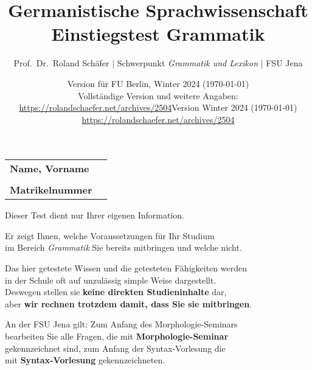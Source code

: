 \documentclass[12pt,a4paper,twoside]{article}
\author{Prof.\ Dr.\ Roland Schäfer | Schwerpunkt \textit{Grammatik und Lexikon} | FSU Jena}
\title{Germanistische Sprachwissenschaft\\Einstiegstest Grammatik}
\date{Version für FU Berlin, Winter 2024 (\today)\\[\baselineskip]
  Vollständige Version und weitere Angaben:\\[0.25\baselineskip]
    \url{https://rolandschaefer.net/archives/2504}}
\date{Version Winter 2024 (\today)\\[0.5\baselineskip]
    \url{https://rolandschaefer.net/archives/2504}}
\newcommand{\rot}[1]{\textcolor{rot}{#1}}
\newcommand{\gruen}[1]{\textcolor{gruen}{#1}}
\newcommand{\Zeile}{\vspace{\baselineskip}}
\begin{document}
\maketitle
\thispagestyle{empty}

\begin{tabular}[h]{lp{8cm}}
  \textbf{Name, Vorname} & \\\cline{2-2}
  &\\
  \textbf{Matrikelnummer} & \\\cline{2-2}
\end{tabular}

\vspace{2cm}

\begin{center}

  \Large{Dieser Test dient nur Ihrer eigenen Information.\\

    \Zeile

  Er zeigt Ihnen, welche Voraussetzungen für Ihr Studium\\
  im Bereich \textit{Grammatik} Sie bereits mitbringen und welche nicht.\\

  \Zeile

  Das hier getestete Wissen und die getesteten Fähigkeiten werden\\
  in der Schule oft auf unzulässig simple Weise dargestellt.\\
  Deswegen stellen sie \textbf{keine direkten Studieninhalte} dar,\\
  aber \textbf{wir rechnen trotzdem damit, dass Sie sie mitbringen}.\\
  
  \Zeile

  An der FSU Jena gilt: Zum Anfang des Morphologie-Seminars\\
  bearbeiten Sie alle Fragen, die mit \textbf{\gruen{Morphologie-Seminar}}\\
  gekennzeichnet sind, zum Anfang der Syntax-Vorlesung die\\
  mit \textbf{\rot{Syntax-Vorlesung}} gekennzeichneten.\\
}
\end{center}

\newpage
\setcounter{page}{1}
\fancyfoot[C]{\thepage}



\end{document}
